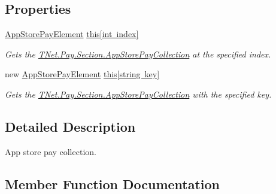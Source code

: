 \subsection*{Properties}
\begin{DoxyCompactItemize}
\item 
\mbox{\hyperlink{class_t_net_1_1_pay_1_1_section_1_1_app_store_pay_element}{App\+Store\+Pay\+Element}} \mbox{\hyperlink{class_t_net_1_1_pay_1_1_section_1_1_app_store_pay_collection_adbdd097a36b109e63e26f9823c171f4d}{this\mbox{[}int index\mbox{]}}}
\begin{DoxyCompactList}\small\item\em Gets the \mbox{\hyperlink{class_t_net_1_1_pay_1_1_section_1_1_app_store_pay_collection}{T\+Net.\+Pay.\+Section.\+App\+Store\+Pay\+Collection}} at the specified index. \end{DoxyCompactList}\item 
new \mbox{\hyperlink{class_t_net_1_1_pay_1_1_section_1_1_app_store_pay_element}{App\+Store\+Pay\+Element}} \mbox{\hyperlink{class_t_net_1_1_pay_1_1_section_1_1_app_store_pay_collection_ad011a4a022156a16a1cdf8442e74d549}{this\mbox{[}string key\mbox{]}}}
\begin{DoxyCompactList}\small\item\em Gets the \mbox{\hyperlink{class_t_net_1_1_pay_1_1_section_1_1_app_store_pay_collection}{T\+Net.\+Pay.\+Section.\+App\+Store\+Pay\+Collection}} with the specified key. \end{DoxyCompactList}\end{DoxyCompactItemize}


\subsection{Detailed Description}
App store pay collection. 



\subsection{Member Function Documentation}
\mbox{\label{class_t_net_1_1_pay_1_1_section_1_1_app_store_pay_collection_ab44cc87b1036bbbd680a9440eed0664a}} 
